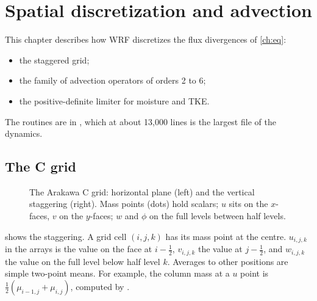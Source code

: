 \chapter{Spatial discretization and advection}\label{ch:adv}

This chapter describes how WRF discretizes the flux divergences of \cref{ch:eq}:
\begin{itemize}
  \item the staggered grid;
  \item the family of advection operators of orders 2 to 6;
  \item the positive-definite limiter for moisture and TKE.
\end{itemize}
The routines are in , which at about 13{,}000 lines is the largest file of the
dynamics.

\section{The C grid}

\begin{figure}[ht]
\centering
{}
\caption{The Arakawa C grid: horizontal plane (left) and the vertical staggering (right). Mass points (dots) hold
scalars; $u$ sits on the $x$-faces, $v$ on the $y$-faces; $w$ and $\phi$ on the full levels between half levels.}
\label{fig:cgrid}
\end{figure}

 shows the staggering. A grid cell $(i,j,k)$ has its mass point at the centre. $u_{i,j,k}$ in the
arrays is the value on the face at $i - \frac12$, $v_{i,j,k}$ the value at $j - \frac12$, and $w_{i,j,k}$ the value
on the full level below half level $k$. Averages to other positions are simple two-point means. For example, the
column mass at a $u$ point is $\frac12(\mu_{i-1,j} + \mu_{i,j})$, computed by
.


